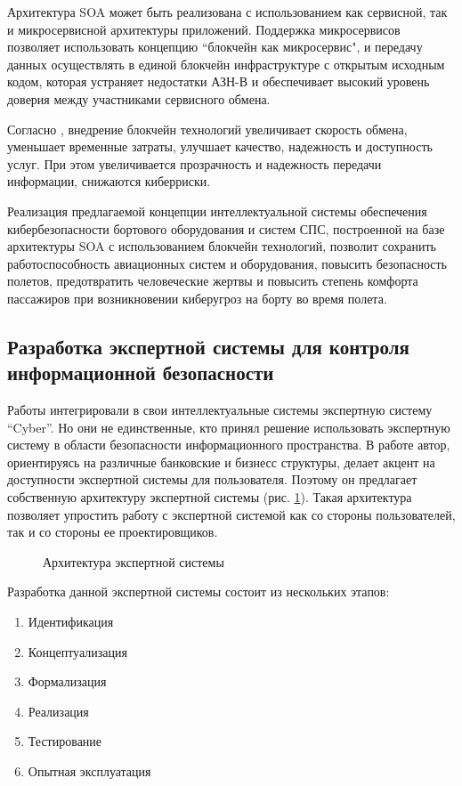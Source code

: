 Архитектура SOA может быть реализована с использованием как сервисной, так и микросервисной архитектуры
приложений. Поддержка микросервисов позволяет использовать концепцию ``блокчейн как микросервис", и передачу
данных осуществлять в единой блокчейн инфраструктуре с открытым исходным кодом, которая устраняет недостатки
АЗН-В \cite{block} и обеспечивает высокий уровень доверия между участниками сервисного обмена.

Согласно \cite{concept}, внедрение блокчейн технологий увеличивает скорость обмена, уменьшает временные затраты, улучшает
качество, надежность и доступность услуг. При этом увеличивается прозрачность и надежность передачи
информации, снижаются киберриски.

Реализация предлагаемой концепции интеллектуальной системы обеспечения кибербезопасности бортового
оборудования и систем СПС, построенной на базе архитектуры SOA с использованием блокчейн технологий,
позволит сохранить работоспособность авиационных систем и оборудования, повысить безопасность полетов,
предотвратить человеческие жертвы и повысить степень комфорта пассажиров при возникновении киберугроз
на борту во время полета.
\subsection{Разработка экспертной системы для контроля информационной безопасности}
Работы \cite{scheme, ontoling} интегрировали в свои интеллектуальные системы экспертную систему ``Cyber''.
Но они не единственные, кто принял решение использовать экспертную систему в области безопасности информационного
пространства. В работе \cite{idea} автор, ориентируясь на различные банковские и бизнесс структуры, делает акцент на
доступности экспертной системы для пользователя. Поэтому он предлагает собственную архитектуру экспертной системы
(рис. \ref{arch}). Такая архитектура позволяет упростить работу с экспертной системой как со стороны пользователей,
так и со стороны ее проектировщиков.

\begin{figure}[h]
    \caption{Архитектура экспертной системы \cite{idea}}
    \label{arch}
\end{figure}

Разработка данной экспертной системы состоит из нескольких этапов:
\begin{enumerate}
    \item
    Идентификация
    \item
    Концептуализация
    \item
    Формализация
    \item
    Реализация
    \item
    Тестирование
    \item
    Опытная эксплуатация
\end{enumerate}


